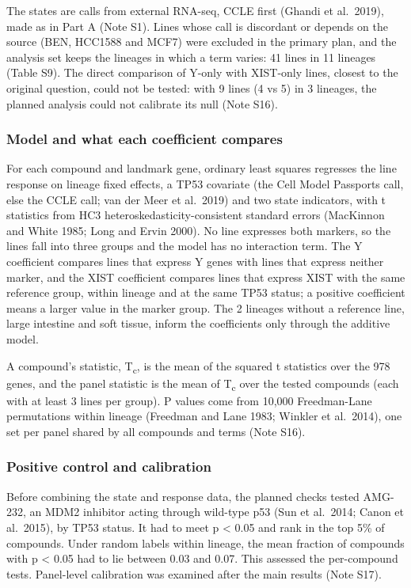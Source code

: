 \documentclass[
  11pt,
  letterpaper,
]{article}
\begin{document}
The states are calls from external RNA-seq, CCLE first (Ghandi et
al.~2019), made as in Part A (Note S1). Lines whose call is discordant
or depends on the source (BEN, HCC1588 and MCF7) were excluded in the
primary plan, and the analysis set keeps the lineages in which a term
varies: 41 lines in 11 lineages (Table S9). The direct comparison of
Y-only with XIST-only lines, closest to the original question, could not
be tested: with 9 lines (4 vs 5) in 3 lineages, the planned analysis
could not calibrate its null (Note S16).

\subsubsection{Model and what each coefficient
compares}\label{model-and-what-each-coefficient-compares}

For each compound and landmark gene, ordinary least squares regresses
the line response on lineage fixed effects, a TP53 covariate (the Cell
Model Passports call, else the CCLE call; van der Meer et al.~2019) and
two state indicators, with t statistics from HC3
heteroskedasticity-consistent standard errors (MacKinnon and White 1985;
Long and Ervin 2000). No line expresses both markers, so the lines fall
into three groups and the model has no interaction term. The Y
coefficient compares lines that express Y genes with lines that express
neither marker, and the XIST coefficient compares lines that express
XIST with the same reference group, within lineage and at the same TP53
status; a positive coefficient means a larger value in the marker group.
The 2 lineages without a reference line, large intestine and soft
tissue, inform the coefficients only through the additive model.

A compound's statistic, T\textsubscript{c}, is the mean of the squared t
statistics over the 978 genes, and the panel statistic is the mean of
T\textsubscript{c} over the tested compounds (each with at least 3 lines
per group). P values come from 10,000 Freedman-Lane permutations within
lineage (Freedman and Lane 1983; Winkler et al.~2014), one set per panel
shared by all compounds and terms (Note S16).

\subsubsection{Positive control and
calibration}\label{positive-control-and-calibration}

Before combining the state and response data, the planned checks tested
AMG-232, an MDM2 inhibitor acting through wild-type p53 (Sun et
al.~2014; Canon et al.~2015), by TP53 status. It had to meet p
\textless{} 0.05 and rank in the top 5\% of compounds. Under random
labels within lineage, the mean fraction of compounds with p \textless{}
0.05 had to lie between 0.03 and 0.07. This assessed the per-compound
tests. Panel-level calibration was examined after the main results (Note
S17).
\end{document}
